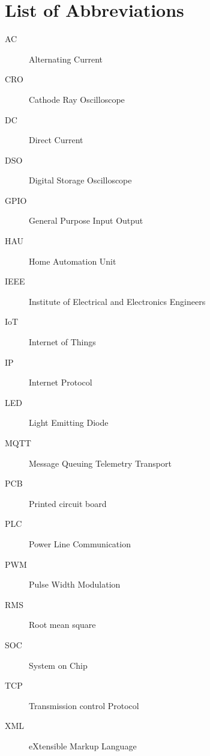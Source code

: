 \chapter*{List of Abbreviations}
    
    \begin{description}
    	
    	\item[AC] Alternating Current
    	\item[CRO] Cathode Ray Oscilloscope
    	\item[DC] Direct Current
    	\item[DSO] Digital Storage Oscilloscope
    	\item[GPIO] General Purpose Input Output
    	\item[HAU] Home Automation Unit
		\item[IEEE] Institute of Electrical and Electronics Engineers
    	\item[IoT] Internet of Things
    	\item[IP] Internet Protocol
    	\item[LED] Light Emitting Diode
    	\item[MQTT] Message Queuing Telemetry Transport
    	\item[PCB] Printed circuit board
    	\item[PLC] Power Line Communication
    	\item[PWM] Pulse Width Modulation
    	\item[RMS] Root mean square
    	\item[SOC] System on Chip
    	\item[TCP] Transmission control Protocol
    	\item[XML] eXtensible Markup Language
    \end{description}